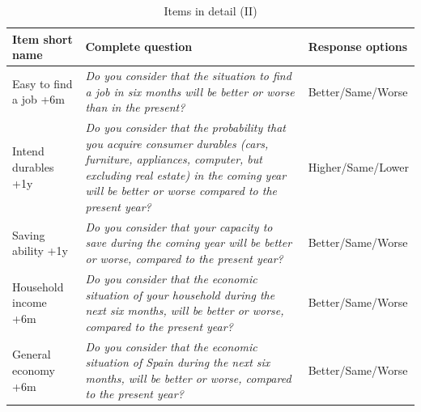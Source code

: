\documentclass[12pt]{article}
\begin{document}
\begin{table}[]
  \caption{Items in detail (II)} 
  \label{item_table_2} 

 \begin{tabular}{  | p{5cm} | p{5cm} | p{5cm} |}
\hline
\multicolumn{1}{|l|}{Item short name}       & \multicolumn{1}{p{8cm}|}{Complete question}                                                                                                                   & \multicolumn{1}{p{3.5cm}|}{Response options} \\ \hline \hline
\multicolumn{1}{|p{4cm}|}{Easy to find a job +6m}       & \multicolumn{1}{p{8cm}|}{\emph{Do you consider that the situation to find a job in six months will be better or worse than in the present?}}  & \multicolumn{1}{p{3cm}|}{Better/Same/Worse}           \\ \hline
\multicolumn{1}{|p{4cm}|}{Intend durables +1y}       & \multicolumn{1}{p{8cm}|}{\emph{Do you consider that the probability that you acquire consumer durables (cars, furniture, appliances, computer, but excluding real estate) in the coming year will be better or worse compared to the present year?}}  & \multicolumn{1}{p{3cm}|}{Higher/Same/Lower}           \\ \hline
\multicolumn{1}{|p{4cm}|}{Saving ability +1y}       & \multicolumn{1}{p{8cm}|}{\emph{Do you consider that your capacity to save during the coming year will be better or worse, compared to the present year?}}  & \multicolumn{1}{p{3cm}|}{Better/Same/Worse}           \\ \hline
\multicolumn{1}{|p{4cm}|}{Household income +6m}       & \multicolumn{1}{p{8cm}|}{\emph{Do you consider that the economic situation of your household during the next six months, will be better or worse, compared to the present year?}}  & \multicolumn{1}{p{3cm}|}{Better/Same/Worse}           \\ \hline
\multicolumn{1}{|p{4cm}|}{General economy +6m}       & \multicolumn{1}{p{8cm}|}{\emph{Do you consider that the economic situation of Spain during the next six months, will be better or worse, compared to the present year?}}  & \multicolumn{1}{p{3cm}|}{Better/Same/Worse}           \\ \hline


\end{tabular}
\end{table}
\end{document}
